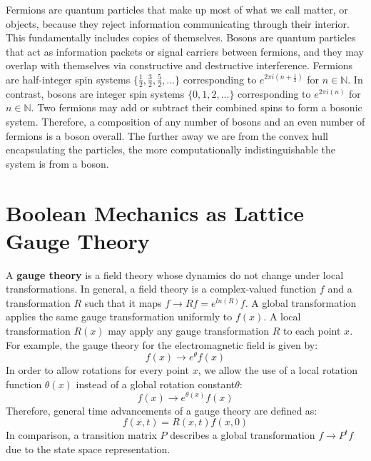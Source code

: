 \documentclass[10pt, a5paper, twoside, openright]{memoir}
\begin{document}
Fermions are quantum particles that make up most of what we call matter, or objects, because they reject information communicating through their interior. This fundamentally includes copies of themselves. Bosons are quantum particles that act as information packets or signal carriers between fermions, and they may overlap with themselves via constructive and destructive interference. Fermions are half-integer spin systems $\{\frac{1}{2}, \frac{3}{2}, \frac{5}{2},...\}$ corresponding to $e^{2\pi i (n+\frac{1}{2})}$ for $n \in \mathbb N$. In contrast, bosons are integer spin systems $\{0, 1, 2,...\}$ corresponding to $e^{2\pi i (n)}$ for $n \in \mathbb N$. Two fermions may add or subtract their combined spins to form a bosonic system. Therefore, a composition of any number of bosons and an even number of fermions is a boson overall. The further away we are from the convex hull encapsulating the particles, the more computationally indistinguishable the system is from a boson.

\section{Boolean Mechanics as Lattice Gauge Theory}
A \textbf{gauge theory} is a field theory whose dynamics do not change under local transformations. In general, a field theory is a complex-valued function $f$ and a transformation $R$ such that it maps $f \rightarrow R f = e^{ln(R)} f$. A global transformation applies the same gauge transformation uniformly to $f(x)$. A local transformation $R(x)$ may apply any gauge transformation $R$ to each point $x$. For example, the gauge theory for the electromagnetic field is given by:
$$f(x) \rightarrow e^{\theta}f(x)$$
In order to allow rotations for every point $x$, we allow the use of a local rotation function $\theta(x)$ instead of a global rotation constant$\theta$:
$$f(x) \rightarrow e^{\theta(x)}f(x)$$
Therefore, general time advancements of a gauge theory are defined as:
$$f(x,t) = R(x,t) f(x,0)$$
In comparison, a transition matrix $P$ describes a global transformation $f \rightarrow P^t f$ due to the state space representation.
\end{document}
